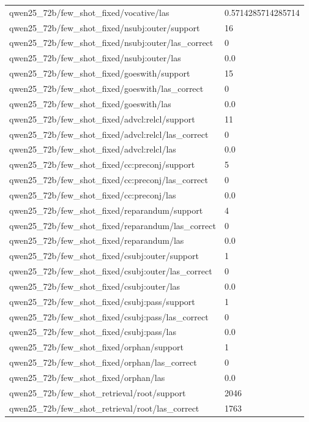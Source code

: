 \begin{tabular}{ll}
qwen25\_72b/few\_shot\_fixed/vocative/las & 0.5714285714285714 \\
qwen25\_72b/few\_shot\_fixed/nsubj:outer/support & 16 \\
qwen25\_72b/few\_shot\_fixed/nsubj:outer/las\_correct & 0 \\
qwen25\_72b/few\_shot\_fixed/nsubj:outer/las & 0.0 \\
qwen25\_72b/few\_shot\_fixed/goeswith/support & 15 \\
qwen25\_72b/few\_shot\_fixed/goeswith/las\_correct & 0 \\
qwen25\_72b/few\_shot\_fixed/goeswith/las & 0.0 \\
qwen25\_72b/few\_shot\_fixed/advcl:relcl/support & 11 \\
qwen25\_72b/few\_shot\_fixed/advcl:relcl/las\_correct & 0 \\
qwen25\_72b/few\_shot\_fixed/advcl:relcl/las & 0.0 \\
qwen25\_72b/few\_shot\_fixed/cc:preconj/support & 5 \\
qwen25\_72b/few\_shot\_fixed/cc:preconj/las\_correct & 0 \\
qwen25\_72b/few\_shot\_fixed/cc:preconj/las & 0.0 \\
qwen25\_72b/few\_shot\_fixed/reparandum/support & 4 \\
qwen25\_72b/few\_shot\_fixed/reparandum/las\_correct & 0 \\
qwen25\_72b/few\_shot\_fixed/reparandum/las & 0.0 \\
qwen25\_72b/few\_shot\_fixed/csubj:outer/support & 1 \\
qwen25\_72b/few\_shot\_fixed/csubj:outer/las\_correct & 0 \\
qwen25\_72b/few\_shot\_fixed/csubj:outer/las & 0.0 \\
qwen25\_72b/few\_shot\_fixed/csubj:pass/support & 1 \\
qwen25\_72b/few\_shot\_fixed/csubj:pass/las\_correct & 0 \\
qwen25\_72b/few\_shot\_fixed/csubj:pass/las & 0.0 \\
qwen25\_72b/few\_shot\_fixed/orphan/support & 1 \\
qwen25\_72b/few\_shot\_fixed/orphan/las\_correct & 0 \\
qwen25\_72b/few\_shot\_fixed/orphan/las & 0.0 \\
qwen25\_72b/few\_shot\_retrieval/root/support & 2046 \\
qwen25\_72b/few\_shot\_retrieval/root/las\_correct & 1763 \\

\end{tabular}
